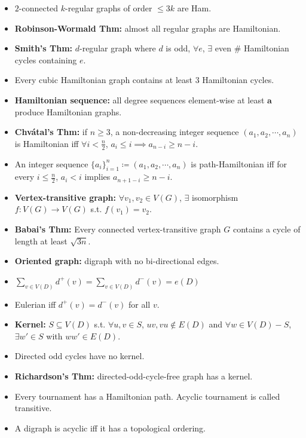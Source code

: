\documentclass[10pt]{article}
\begin{document}
\begin{multicols*}{3}
\begin{itemize}
            \item $2$-connected $k$-regular graphs of order $\leq 3k$ are Ham.
            \item \textbf{Robinson-Wormald Thm:} almost all regular graphs are Hamiltonian.
            \item \textbf{Smith's Thm:} $d$-regular graph where $d$ is odd, $\forall e$, $\exists$ even \# Hamiltonian cycles containing $e$.
            \item Every cubic Hamiltonian graph contains at least $3$ Hamiltonian cycles.
            \item \textbf{Hamiltonian sequence:} all degree sequences element-wise at least $\bm{a}$ produce Hamiltonian graphs.
            \item \textbf{Chv\'{a}tal's Thm:} if $n \geq 3$, a non-decreasing integer sequence $(a_1, a_2, \cdots, a_n)$ is Hamiltonian iff $\forall i < \frac{n}{2}$, $a_i \leq i \implies a_{n - i} \geq n - i$.
            \item An integer sequence $\{a_i\}_{i = 1}^n \coloneqq (a_1, a_2, \cdots, a_n)$ is path-Hamiltonian iff for every $i \leq \frac{n}{2}$, $a_i < i$ implies $a_{n + 1 - i} \geq n - i$.
            \item \textbf{Vertex-transitive graph:} $\forall v_1, v_2 \in V(G)$, $\exists$ isomorphism $f \colon V(G) \to V(G)$ s.t. $f(v_1) = v_2$.
            \item \textbf{Babai's Thm:} Every connected vertex-transitive graph $G$ contains a cycle of length at least $\sqrt{3n}$.
            \item \textbf{Oriented graph:} digraph with no bi-directional edges.
            \item $\sum_{v \in V(D)}d^+(v) = \sum_{v \in V(D)}d^-(v) = e(D)$
            \item Eulerian iff $d^+(v) =d^-(v)$ for all $v$.
            \item \textbf{Kernel:} $S \subseteq V(D)$ s.t. $\forall u, v \in S$, $uv, vu \notin E(D)$ and $\forall w \in V(D) - S$, $\exists w' \in S$ with $ww' \in E(D)$.
            \item Directed odd cycles have no kernel.
            \item \textbf{Richardson's Thm:} directed-odd-cycle-free graph has a kernel.
            \item Every tournament has a Hamiltonian path. Acyclic tournament is called transitive.
            \item A digraph is acyclic iff it has a topological ordering.

\end{itemize}
\end{multicols*}
\end{document}
